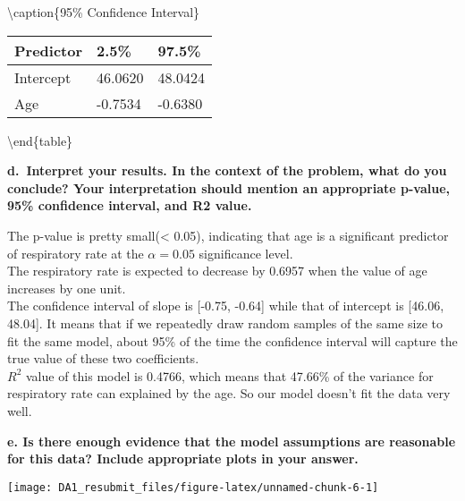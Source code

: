 \documentclass[
]{article}
\begin{document}
\textbackslash caption\{\label{tab:unnamed-chunk-5}95\% Confidence
Interval\} \centering

\begin{tabu} to 
\hline
Predictor & 2.5\% & 97.5\%\\
\hline
Intercept & 46.0620 & 48.0424\\
\hline
Age & -0.7534 & -0.6380\\
\hline
\end{tabu}

\textbackslash end\{table\}

\textbf{d.~Interpret your results. In the context of the problem, what
do you conclude? Your interpretation should mention an appropriate
p-value, 95\% confidence interval, and R2 value.}

The p-value is pretty small(\textless{} 0.05), indicating that age is a
significant predictor of respiratory rate at the \(\alpha = 0.05\)
significance level.\\
The respiratory rate is expected to decrease by 0.6957 when the value of
age increases by one unit.\\
The confidence interval of slope is {[}-0.75, -0.64{]} while that of
intercept is {[}46.06, 48.04{]}. It means that if we repeatedly draw
random samples of the same size to fit the same model, about 95\% of the
time the confidence interval will capture the true value of these two
coefficients.\\
\(R^2\) value of this model is 0.4766, which means that 47.66\% of the
variance for respiratory rate can explained by the age. So our model
doesn't fit the data very well.

\textbf{e. Is there enough evidence that the model assumptions are
reasonable for this data? Include appropriate plots in your answer.}

\begin{center}\texttt{[image: DA1\_resubmit\_files/figure-latex/unnamed-chunk-6-1]} \end{center}
\end{document}
